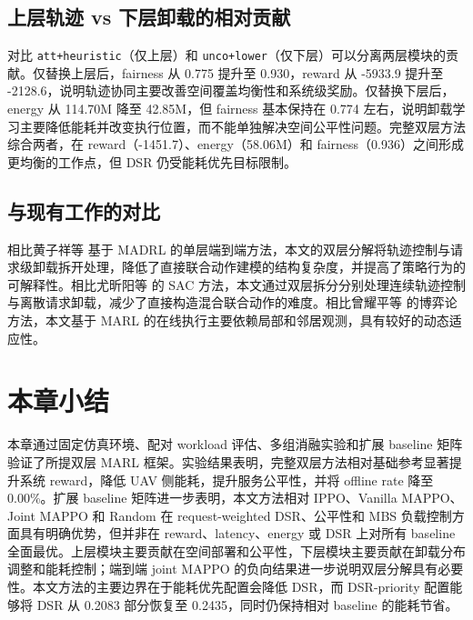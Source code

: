 \subsection{上层轨迹 vs 下层卸载的相对贡献}
\label{subsec:layer-contribution}

对比 \texttt{att+heuristic}（仅上层）和 \texttt{unco+lower}（仅下层）可以分离两层模块的贡献。仅替换上层后，fairness 从 0.775 提升至 0.930，reward 从 -5933.9 提升至 -2128.6，说明轨迹协同主要改善空间覆盖均衡性和系统级奖励。仅替换下层后，energy 从 114.70M 降至 42.85M，但 fairness 基本保持在 0.774 左右，说明卸载学习主要降低能耗并改变执行位置，而不能单独解决空间公平性问题。完整双层方法综合两者，在 reward（-1451.7）、energy（58.06M）和 fairness（0.936）之间形成更均衡的工作点，但 DSR 仍受能耗优先目标限制。

\subsection{与现有工作的对比}
\label{subsec:comparison}

相比黄子祥等 \cite{huang2026madr} 基于 MADRL 的单层端到端方法，本文的双层分解将轨迹控制与请求级卸载拆开处理，降低了直接联合动作建模的结构复杂度，并提高了策略行为的可解释性。相比尤昕阳等 \cite{you2026soft} 的 SAC 方法，本文通过双层拆分分别处理连续轨迹控制与离散请求卸载，减少了直接构造混合联合动作的难度。相比曾耀平等 \cite{zeng2026uav} 的博弈论方法，本文基于 MARL 的在线执行主要依赖局部和邻居观测，具有较好的动态适应性。

\section{本章小结}
\label{sec:summary-chap05}

本章通过固定仿真环境、配对 workload 评估、多组消融实验和扩展 baseline 矩阵验证了所提双层 MARL 框架。实验结果表明，完整双层方法相对基础参考显著提升系统 reward，降低 UAV 侧能耗，提升服务公平性，并将 offline rate 降至 0.00\%。扩展 baseline 矩阵进一步表明，本文方法相对 IPPO、Vanilla MAPPO、Joint MAPPO 和 Random 在 request-weighted DSR、公平性和 MBS 负载控制方面具有明确优势，但并非在 reward、latency、energy 或 DSR 上对所有 baseline 全面最优。上层模块主要贡献在空间部署和公平性，下层模块主要贡献在卸载分布调整和能耗控制；端到端 joint MAPPO 的负向结果进一步说明双层分解具有必要性。本文方法的主要边界在于能耗优先配置会降低 DSR，而 DSR-priority 配置能够将 DSR 从 0.2083 部分恢复至 0.2435，同时仍保持相对 baseline 的能耗节省。
